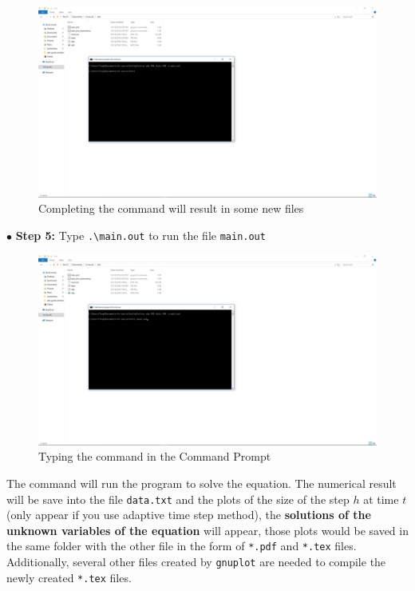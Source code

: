\documentclass[a4paper,oneside]{book}
\numberwithin{equation}{chapter}
\begin{document}
	\begin{figure}[H]
		\centering	\includegraphics[width=15cm]{wfig6}
		\caption{Completing the command will result in some new files}
	\end{figure}
	\noindent$\bullet$ \textbf{Step 5:} Type \texttt{.\textbackslash main.out} to run the file \texttt{main.out}
	\begin{figure}[H]
		\centering	\includegraphics[width=15cm]{wfig7}
		\caption{Typing the command in the Command Prompt}
	\end{figure}
	\noindent The command will run the program to solve the equation. The numerical result will be save into the file \texttt{data.txt} and the plots of the size of the step $h$ at time $t$ (only appear if you use adaptive time step method), the \textbf{solutions of the unknown variables of the equation} will appear, those plots would be saved in the same folder with the other file in the form of \texttt{*.pdf} and \texttt{*.tex} files. Additionally, several other files created by \texttt{gnuplot} are needed to compile the newly created \texttt{*.tex} files. 
\end{document}
